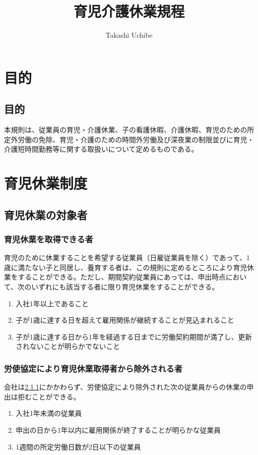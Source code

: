 \documentclass{jsarticle}
\begin{document}
\title{育児介護休業規程}
\author{Takashi Uchibe}
\maketitle

\section{目的}

\subsection{目的}
本規則は、従業員の育児・介護休業、子の看護休暇、介護休暇、育児のための所定外労働の免除、育児・介護のための時間外労働及び深夜業の制限並びに育児・介護短時間勤務等に関する取扱いについて定めるものである。

\section{育児休業制度}
\label{育介_章_育児休業制度}

\subsection{育児休業の対象者}
\label{育介_条_育児休業の対象者}

\subsubsection{育児休業を取得できる者}
\label{育介_項_育児休業を取得できる者}
育児のために休業することを希望する従業員（日雇従業員を除く）であって、1歳に満たない子と同居し、養育する者は、この規則に定めるところにより育児休業をすることができる。ただし、期間契約従業員にあっては、申出時点において、次のいずれにも該当する者に限り育児休業をすることができる。
\begin{enumerate}
  \item 入社1年以上であること
  \item 子が1歳に達する日を超えて雇用関係が継続することが見込まれること
  \item 子が1歳に達する日から1年を経過する日までに労働契約期間が満了し、更新されないことが明らかでないこと
\end{enumerate}

\subsubsection{労使協定により育児休業取得者から除外される者}
\label{育介_項_労使協定により育児休業取得者から除外される者}
会社は\ref{育介_項_育児休業を取得できる者}にかかわらず、労使協定により除外された次の従業員からの休業の申出は拒むことができる。
\begin{enumerate}
  \item 入社1年未満の従業員
  \item 申出の日から1年以内に雇用関係が終了することが明らかな従業員
  \item 1週間の所定労働日数が2日以下の従業員
\end{enumerate}
\end{document}
